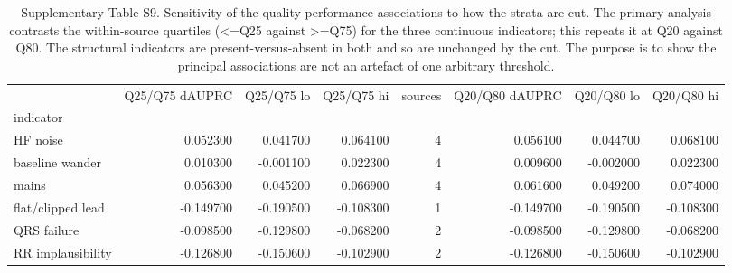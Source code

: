 \begin{table}
\caption{Supplementary Table S9. Sensitivity of the quality-performance associations to how the strata are cut. The primary analysis contrasts the within-source quartiles (<=Q25 against >=Q75) for the three continuous indicators; this repeats it at Q20 against Q80. The structural indicators are present-versus-absent in both and so are unchanged by the cut. The purpose is to show the principal associations are not an artefact of one arbitrary threshold.}
\begin{tabular}{lrrrrrrr}
\toprule
 & Q25/Q75 dAUPRC & Q25/Q75 lo & Q25/Q75 hi & sources & Q20/Q80 dAUPRC & Q20/Q80 lo & Q20/Q80 hi \\
indicator &  &  &  &  &  &  &  \\
\midrule
HF noise & 0.052300 & 0.041700 & 0.064100 & 4 & 0.056100 & 0.044700 & 0.068100 \\
baseline wander & 0.010300 & -0.001100 & 0.022300 & 4 & 0.009600 & -0.002000 & 0.022300 \\
mains & 0.056300 & 0.045200 & 0.066900 & 4 & 0.061600 & 0.049200 & 0.074000 \\
flat/clipped lead & -0.149700 & -0.190500 & -0.108300 & 1 & -0.149700 & -0.190500 & -0.108300 \\
QRS failure & -0.098500 & -0.129800 & -0.068200 & 2 & -0.098500 & -0.129800 & -0.068200 \\
RR implausibility & -0.126800 & -0.150600 & -0.102900 & 2 & -0.126800 & -0.150600 & -0.102900 \\
\bottomrule
\end{tabular}
\end{table}
